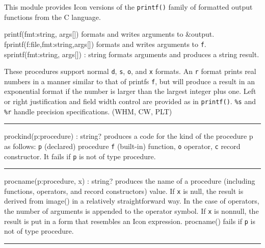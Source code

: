 This module provides Icon versions of the
\texttt{printf()} family of formatted output functions
from the C language.

\textsf{printf(fmt:string, args[])} formats and writes arguments to
\textsf{\&output}.\\
\textsf{fprintf(f:file,fmt:string,args[])} formats and writes arguments
to \texttt{f}.\\
\textsf{sprintf(fmt:string, args[]) : string} formats arguments and
produces a string result.

These procedures support normal \texttt{d}, \texttt{s}, \texttt{o}, and
\texttt{x} formats. An \texttt{{\textquotedbl}r{\textquotedbl}} format
prints real numbers in a manner similar to that of
printf{\textquotesingle}s \texttt{{\textquotedbl}f{\textquotedbl}}, but
will produce a result in an exponential format if the number is larger
than the largest integer plus one. Left or right justification and
field width control are provided as in \texttt{printf()}. \texttt{\%s}
and \texttt{\%r} handle precision specifications. (WHM, CW, PLT)

\vspace{0.25cm}\hrule{}

\textsf{prockind(p:procedure) : string?} produces a code for the kind of
the procedure p as follows: \texttt{{\textquotedbl}p{\textquotedbl}}
(declared) procedure \texttt{{\textquotedbl}f{\textquotedbl}}
(built-in) function, \texttt{{\textquotedbl}o{\textquotedbl}} operator,
\texttt{{\textquotedbl}c{\textquotedbl}} record
constructor. It fails if \texttt{p} is not of type
procedure. 

\vspace{0.25cm}\hrule{}

\textsf{procname(p:procedure, x) : string?} produces the name of a
procedure (including functions, operators, and record
constructors) value. If \texttt{x} is null,
the result is derived from \textsf{image()} in a relatively
straightforward way. In the case of operators, the number of arguments
is appended to the operator symbol. If \texttt{x} is nonnull, the
result is put in a form that resembles an Icon expression.
\textsf{procname()} fails if \texttt{p} is not of type procedure. 

\vspace{0.25cm}\hrule{}

